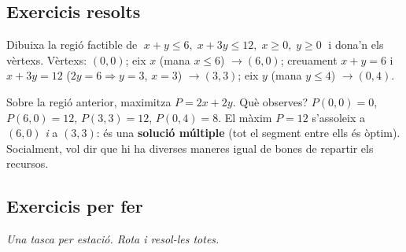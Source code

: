 \subsection{Exercicis resolts}

\begin{exresolt}
Dibuixa la regió factible de $\;x+y\le 6,\;x+3y\le 12,\;x\ge 0,\;y\ge 0\;$ i dona'n
els vèrtexs.
\solucio
Vèrtexs: $(0,0)$; eix $x$ (mana $x\le 6$) $\rightarrow (6,0)$; creuament $x+y=6$ i
$x+3y=12$ ($2y=6\Rightarrow y=3$, $x=3$) $\rightarrow (3,3)$; eix $y$ (mana $y\le 4$)
$\rightarrow (0,4)$.

\begin{center}
\end{center}
\end{exresolt}

\begin{exresolt}
Sobre la regió anterior, maximitza $P=2x+2y$. Què observes?
\solucio
$P(0,0)=0$, $P(6,0)=12$, $P(3,3)=12$, $P(0,4)=8$. El màxim $P=12$ s'assoleix a
$(6,0)$ \emph{i} a $(3,3)$: és una \textbf{solució múltiple} (tot el segment entre
ells és òptim). Socialment, vol dir que hi ha diverses maneres igual de bones de
repartir els recursos.
\end{exresolt}

\subsection{Exercicis per fer}

\noindent\textit{Una tasca per estació. Rota i resol-les totes.}

